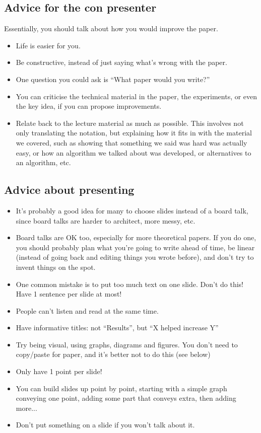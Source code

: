 \documentclass[twoside]{article}
\begin{document}
\subsection{Advice for the con presenter}
\label{sec:advice-con-presenter}

Essentially, you should talk about how you would improve the paper.

\begin{itemize}
\item Life is easier for you.
\item Be constructive, instead of just saying what's wrong with the paper.
\item One question you could ask is ``What paper would you write?''
\item You can criticise the technical material in the paper, the experiments, or even the key idea, if you can propose improvements.
  \item Relate back to the lecture material as much as possible. This involves not only translating the notation, but explaining how it fits in with the material we covered, such as showing that something we said was hard was actually easy, or how an algorithm we talked about was developed, or alternatives to an algorithm, etc.
\end{itemize}

\subsection{Advice about presenting}
\label{sec:advise-about-pres}

\begin{itemize}
\item It's probably a good idea for many to choose slides instead of a board talk, since board talks are harder to architect, more messy, etc.
\item Board talks are OK too, especially for more theoretical papers. If you do one, you should probably plan what you're going to write ahead of time, be linear (instead of going back and editing things you wrote before), and don't try to invent things on the spot.
\item One common mistake is to put too much text on one slide. Don't do this! Have 1 sentence per slide at most!
\item People can't listen and read at the same time.
\item Have informative titles: not ``Results'', but ``X helped increase Y''
\item Try being visual, using graphs, diagrams and figures. You don't need to copy/paste for paper, and it's better not to do this (see below)
\item Only have 1 point per slide!
\item You can build slides up point by point, starting with a simple graph conveying one point, adding some part that conveys extra, then adding more...
\item Don't put something on a slide if you won't talk about it.
\end{itemize}
\end{document}
